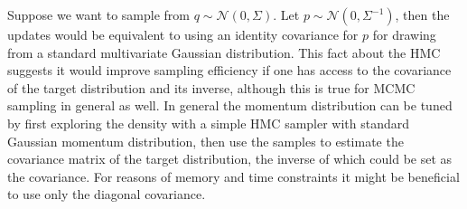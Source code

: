 \documentclass[12pt]{report}
\begin{document}
Suppose we want to sample from $q \sim \mathcal{N}(0,\Sigma)$. Let $p \sim
\mathcal{N}(0,\Sigma^{-1})$, then the updates would be equivalent to using an
identity covariance for $p$ for drawing from a standard multivariate Gaussian
distribution. This
fact about the HMC suggests it would improve sampling efficiency if one has
access to the covariance of the target distribution and its inverse, although this is true for
MCMC sampling in general as well. 
In general the momentum distribution can be tuned by first exploring the density
with a simple HMC sampler with standard Gaussian momentum distribution, then use
the samples to estimate the covariance matrix of the target distribution, the
inverse of which could be set as the covariance.  For reasons of memory and time constraints it might be beneficial to use only the diagonal covariance. 
\end{document}
